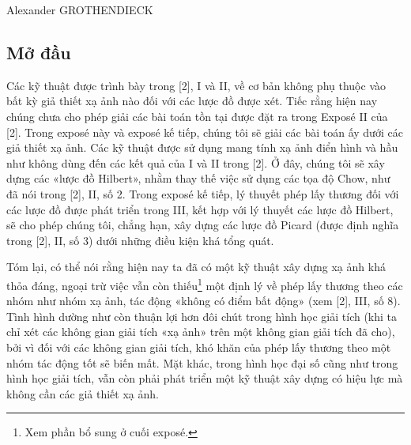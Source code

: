%
  {Alexander GROTHENDIECK}

\subsection*{Mở đầu}

Các kỹ thuật được trình bày trong [2], I và II, về cơ bản không phụ thuộc vào
bất kỳ giả thiết xạ ảnh nào đối với các lược đồ được xét. Tiếc rằng hiện nay
chúng chưa cho phép giải các bài toán tồn tại được đặt ra trong Exposé II của
[2]. Trong exposé này và exposé kế tiếp, chúng tôi sẽ giải các bài toán ấy dưới
các giả thiết xạ ảnh. Các kỹ thuật được sử dụng mang tính xạ ảnh điển hình và
hầu như không dùng đến các kết quả của I và II trong [2]. Ở đây, chúng tôi sẽ
xây dựng các «lược đồ Hilbert», nhằm thay thế việc sử dụng các tọa độ Chow, như
đã nói trong [2], II, số 2. Trong exposé kế tiếp, lý thuyết phép lấy thương đối
với các lược đồ được phát triển trong III, kết hợp với lý thuyết các lược đồ
Hilbert, sẽ cho phép chúng tôi, chẳng hạn, xây dựng các lược đồ Picard (được
định nghĩa trong [2], II, số 3) dưới những điều kiện khá tổng quát.

Tóm lại, có thể nói rằng hiện nay ta đã có một kỹ thuật xây dựng xạ ảnh khá
thỏa đáng, ngoại trừ việc vẫn còn thiếu\footnote{Xem phần bổ sung ở cuối
exposé.} một định lý về phép lấy thương theo các nhóm như nhóm xạ ảnh, tác động
«không có điểm bất động» (xem [2], III, số 8). Tình hình dường như còn thuận lợi
hơn đôi chút trong hình học giải tích (khi ta chỉ xét các không gian giải tích
«xạ ảnh» trên một không gian giải tích đã cho), bởi vì đối với các không gian
giải tích, khó khăn của phép lấy thương theo một nhóm tác động tốt sẽ biến mất.
Mặt khác, trong hình học đại số cũng như trong hình học giải tích, vẫn còn phải
phát triển một kỹ thuật xây dựng có hiệu lực mà không cần các giả thiết xạ ảnh.


